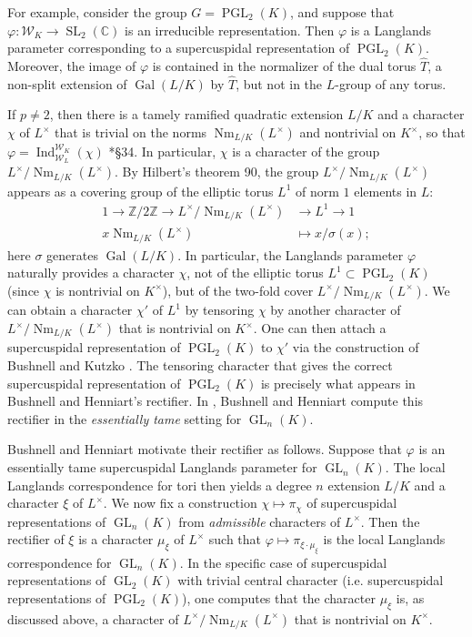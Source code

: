 \documentclass{amsart}
\theoremstyle{plain}
\theoremstyle{definition}
\numberwithin{equation}{section}
\DeclareMathOperator{\Gal}{Gal}
\DeclareMathOperator{\Nm}{Nm}
\DeclareMathOperator{\Ind}{Ind}
\DeclareMathOperator{\GL}{GL}
\DeclareMathOperator{\PGL}{PGL}
\DeclareMathOperator{\SL}{SL}
\newcommand{\CC}{\mathbb{C}}
\newcommand{\Kx}{K^\times}
\newcommand{\Lx}{L^\times}
\newcommand{\Weil}{\mathcal{W}}
\begin{document}
For example, consider the group $G = \PGL_{2}(K)$, and suppose that
$\varphi : \Weil_K \rightarrow \SL_{2}(\CC)$ is an
irreducible representation.  Then $\varphi$ is a Langlands parameter corresponding
to a supercuspidal representation of $\PGL_2(K)$.  Moreover, the image of $\varphi$
is contained in the normalizer of the dual torus $\hat{T}$, a non-split
extension of $\Gal(L/K)$ by $\hat{T}$, but not in the $L$-group of any torus.

If $p \neq 2$, then there is a tamely ramified quadratic
extension $L/K$ and a character
$\chi$ of $\Lx$ that is trivial on the norms $\Nm_{L/K}(\Lx)$ and nontrivial on $\Kx$, so that
$\varphi = \Ind_{\Weil_L}^{\Weil_K}(\chi)$ \cite{bushnell-henniart:06a}*{\S 34}.  In particular, $\chi$ is a character of the group $\Lx / \Nm_{L/K}(\Lx)$.
By Hilbert's theorem 90, the group $\Lx / \Nm_{L/K}(\Lx)$ appears as a covering group of the elliptic torus $L^1$ of norm $1$ elements in $L$:
\begin{align*}
1 \rightarrow \mathbb{Z} / 2 \mathbb{Z} \rightarrow \Lx / \Nm_{L/K}(\Lx) &\rightarrow L^1 \rightarrow 1 \\
x \Nm_{L/K}(L^{\times}) &\mapsto x / \sigma(x);
\end{align*}
here $\sigma$ generates $\Gal(L/K)$.  In particular, the Langlands parameter
$\varphi$ naturally provides a character $\chi$, not of the elliptic torus
$L^1 \subset \PGL_2(K)$ (since $\chi$ is nontrivial on $\Kx$),
but of the two-fold cover $\Lx / \Nm_{L/K}(\Lx)$.  We can obtain a character $\chi'$ of $L^1$
by tensoring $\chi$ by another character of
$\Lx / \Nm_{L/K}(\Lx)$ that is nontrivial on $\Kx$.  One can then attach a supercuspidal representation
of $\PGL_2(K)$ to $\chi'$ via the construction of Bushnell and Kutzko \cite{bushnell-kutzko:AdmissibleDual}.
The tensoring character that gives the correct supercuspidal representation of $\PGL_2(K)$
is precisely what appears in Bushnell and Henniart's rectifier.  In \cite{bushnell-henniart:10a},
Bushnell and Henniart compute this rectifier in the \emph{essentially tame} setting for $\GL_n(K)$.

Bushnell and Henniart motivate their rectifier as follows.
Suppose that $\varphi$ is an essentially tame supercuspidal Langlands parameter for
$\GL_n(K)$.  The local Langlands correspondence for tori then yields a degree $n$ extension
$L/K$ and a character $\xi$ of $L^{\times}$.  We now fix a construction $\chi \mapsto \pi_{\chi}$
of supercuspidal representations of $\GL_n(K)$ from \emph{admissible} characters of $L^{\times}$.
Then the rectifier of $\xi$ is a character $\mu_{\xi}$ of $L^{\times}$ such that
$\varphi \mapsto \pi_{\xi \cdot \mu_{\xi}}$ is the local Langlands correspondence for $\GL_n(K)$.
In the specific case of supercuspidal representations of $\GL_2(K)$ with trivial central character
(i.e. supercuspidal representations of $\PGL_2(K)$), one computes that the character $\mu_{\xi}$ is,
as discussed above, a character of $\Lx / \Nm_{L/K}(\Lx)$ that is nontrivial on $\Kx$.
\end{document}
